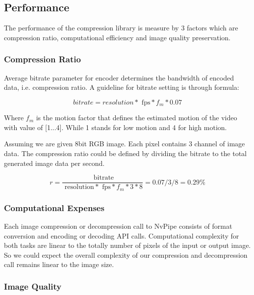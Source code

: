 \documentclass{vgtc}                          %
\begin{document}
\subsection{Performance}

The performance of the compression library is measure by 3 factors which are compression ratio, computational efficiency and image quality preservation.

\subsubsection{Compression Ratio}

Average bitrate parameter for encoder determines the bandwidth of encoded data, i.e. compression ratio. A guideline for bitrate setting is through formula:

\begin{equation}
\label{formula:bitrate}
 bitrate = resolution * \text{ fps} * f_m * 0.07
\end{equation}

Where \(f_m\) is the motion factor that defines the estimated motion of the video with value of [1...4]. While 1 stands for low motion and 4 for high motion.

Assuming we are given 8bit RGB image. Each pixel contains 3 channel of image data. The compression ratio could be defined by dividing the bitrate to the total generated image data per second.

\begin{equation}
\label{formula:compress_ratio}
 r = \frac{ \text{ bitrate}}{ \text{ resolution} * \text{ fps} * f_m * 3 * 8} = 0.07/3/8 = 0.29\%
\end{equation}

\subsubsection{Computational Expenses}

Each image compression or decompression call to NvPipe consists of format conversion and encoding or decoding API calls. Computational complexity for both tasks are linear to the totally number of pixels of the input or output image. So we could expect the overall complexity of our compression and decompression call remains linear to the image size.

\subsubsection{Image Quality}
\end{document}
